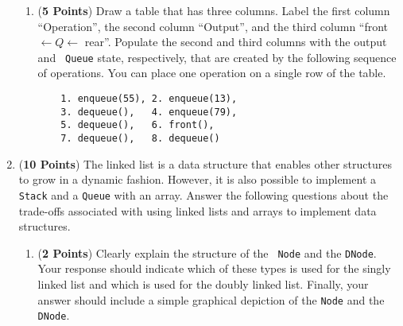 \documentclass[12pt]{article}
\begin{document}
\begin{enumerate}
\begin{enumerate}
    \item ({\bf 5 Points}) Draw a table that has three columns.  Label
      the first column ``Operation'', the second column ``Output'',
      and the third column ``front $\leftarrow Q \leftarrow$ rear''.
      Populate the second and third columns with the output and {\tt
        Queue} state, respectively, that are created by the following
      sequence of operations.  You can place one operation on a single
      row of the table.

      \begin{verbatim} 
	1. enqueue(55), 2. enqueue(13), 
	3. dequeue(),   4. enqueue(79),
	5. dequeue(),   6. front(), 
	7. dequeue(),   8. dequeue() 
      \end{verbatim}

    \end{enumerate}
      
\newpage


\item ({\bf 10 Points}) The linked list is a data structure that
  enables other structures to grow in a dynamic fashion.  However, it
  is also possible to implement a {\tt Stack} and a {\tt Queue} with
  an array.  Answer the following questions about the trade-offs
  associated with using linked lists and arrays to implement data
  structures.

  \begin{enumerate}



  \item ({\bf 2 Points}) Clearly explain the structure of the {\tt
    Node} and the {\tt DNode}.  Your response should indicate which of
    these types is used for the singly linked list and which is used
    for the doubly linked list.  Finally, your answer should include a
    simple graphical depiction of the {\tt Node} and the {\tt DNode}.


\end{enumerate}
\end{enumerate}
\end{document}
